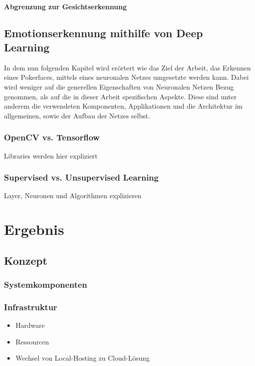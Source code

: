 \documentclass[12pt, a4paper]{scrbook}
\begin{document}
\subsubsection{Abgrenzung zur Gesichtserkennung}


\section{Emotionserkennung mithilfe von Deep Learning}

In dem nun folgenden Kapitel wird erörtert wie das Ziel der Arbeit, das Erkennen eines Pokerfaces, mittels eines neuronalen Netzes umgesetzte werden kann. Dabei wird weniger auf die generellen Eigenschaften von Neuronalen Netzen Bezug genommen, als auf die in dieser Arbeit spezifischen Aspekte. Diese sind unter anderem die verwendeten Komponenten, Applikationen und die Architektur im allgemeinen, sowie der Aufbau der Netzes selbst.
\subsection{OpenCV vs. Tensorflow}
Libraries werden hier expliziert
\subsection{Supervised vs. Unsupervised Learning}
Layer, Neuronen und Algorithmen explizieren 



\let\cleardoublepage\relax
\newpage





\chapter{Ergebnis}


\section{Konzept}

\subsection{Systemkomponenten}

\subsection{Infrastruktur}
\begin{itemize}
\item Hardware
\item Ressourcen
\item Wechsel von Local-Hosting zu Cloud-Lösung
\end{itemize}
\end{document}
